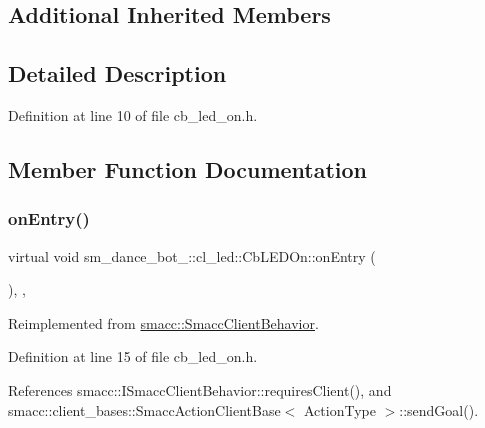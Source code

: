 \subsection*{Additional Inherited Members}


\subsection{Detailed Description}


Definition at line 10 of file cb\+\_\+led\+\_\+on.\+h.



\subsection{Member Function Documentation}
\mbox{\label{classsm__dance__bot__2_1_1cl__led_1_1CbLEDOn_adee6590f4b50a9cf26cf22f6e39b7965}} 
\subsubsection{\texorpdfstring{on\+Entry()}{onEntry()}}
{\footnotesize\ttfamily virtual void sm\+\_\+dance\+\_\+bot\+\_\+::cl\+\_\+led\+::\+Cb\+L\+E\+D\+On\+::on\+Entry (\begin{DoxyParamCaption}{ }\end{DoxyParamCaption})\hspace{0.3cm}{\ttfamily [inline]}, {\ttfamily [override]}, {\ttfamily [virtual]}}



Reimplemented from \hyperlink{classsmacc_1_1SmaccClientBehavior_ad5d3e1f1697c3cfe66c94cadba948493}{smacc\+::\+Smacc\+Client\+Behavior}.



Definition at line 15 of file cb\+\_\+led\+\_\+on.\+h.



References smacc\+::\+I\+Smacc\+Client\+Behavior\+::requires\+Client(), and smacc\+::client\+\_\+bases\+::\+Smacc\+Action\+Client\+Base$<$ Action\+Type $>$\+::send\+Goal().


